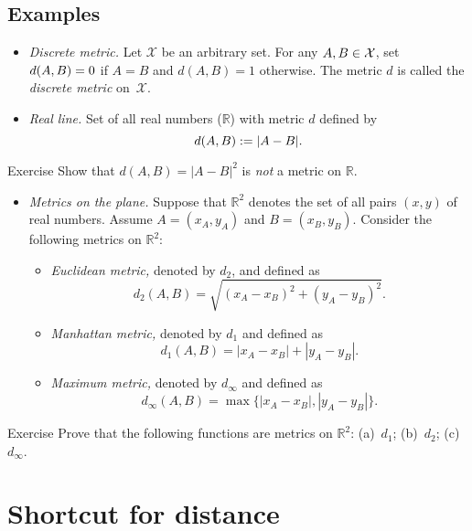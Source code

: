 \pagebreak

\subsection*{Examples}

\begin{itemize}
\item {}\emph{Discrete metric.} Let $\mathcal X$ be an arbitrary set. 
For any $A,B\z\in\mathcal X$, 
set $d(A,B)\z=0$ if $A=B$ and $d(A,B)=1$ otherwise.
The metric $d$ is called the \emph{discrete metric} on~$\mathcal X$.
\item{}\emph{Real line.}
Set of all real numbers ($\mathbb{R}$) with metric $d$ defined by 
$$d(A,B):=|A-B|.$$
\end{itemize}

\begin{thm}{Exercise}\label{ex:dist-square}
Show that $d(A,B)=|A-B|^2$ is {}\emph{not} a metric on $\mathbb{R}$.
\end{thm}

\begin{itemize}
\item \textit{Metrics on the plane.}
Suppose that $\mathbb{R}^2$ denotes the set of all pairs $(x,y)$ of real numbers.
Assume $A=(x_A,y_A)$ and $B=(x_B,y_B)$.
Consider the following metrics on $\mathbb{R}^2$:
\begin{itemize}
\item{}\emph{Euclidean metric,} denoted by $d_2$, and defined as \label{def:d_2}
$$d_2(A,B)=\sqrt{(x_A-x_B)^2+(y_A-y_B)^2}.$$
\item\label{Manhattan plane}\emph{Manhattan metric,} denoted by $d_1$ and defined as 
$$d_1(A,B)=|x_A-x_B|+|y_A-y_B|.$$
\item{}\emph{Maximum metric,} denoted by $d_\infty$ and defined as 
$$d_\infty(A,B)=\max\{|x_A-x_B|,|y_A-y_B|\}.$$
\end{itemize}
\end{itemize}

\begin{thm}{Exercise}\label{ex:d_1+d_2+d_infty}
Prove that the following functions are metrics on $\mathbb{R}^2$:
(a)~$d_1$; (b)~$d_2$; (c)~$d_\infty$.
\end{thm}


\section{Shortcut for distance}

